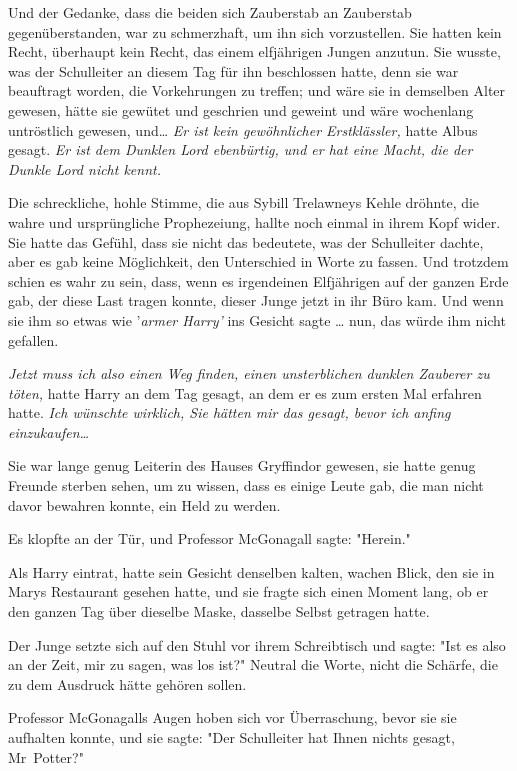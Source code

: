 {Und der Gedanke, dass die beiden sich Zauberstab an Zauberstab gegenüberstanden, war zu schmerzhaft, um ihn sich vorzustellen. Sie hatten kein Recht, überhaupt kein Recht, das einem elfjährigen Jungen anzutun. Sie wusste, was der Schulleiter an diesem Tag für ihn beschlossen hatte, denn sie war beauftragt worden, die Vorkehrungen zu treffen; und wäre sie in demselben Alter gewesen, hätte sie gewütet und geschrien und geweint und wäre wochenlang untröstlich gewesen, und… \emph{Er ist kein gewöhnlicher Erstklässler,} hatte Albus gesagt. \emph{Er ist dem Dunklen Lord ebenbürtig, und er hat eine Macht, die der Dunkle Lord nicht kennt.}

Die schreckliche, hohle Stimme, die aus Sybill Trelawneys Kehle dröhnte, die wahre und ursprüngliche Prophezeiung, hallte noch einmal in ihrem Kopf wider. Sie hatte das Gefühl, dass sie nicht das bedeutete, was der Schulleiter dachte, aber es gab keine Möglichkeit, den Unterschied in Worte zu fassen. Und trotzdem schien es wahr zu sein, dass, wenn es irgendeinen Elfjährigen auf der ganzen Erde gab, der diese Last tragen konnte, dieser Junge jetzt in ihr Büro kam. Und wenn sie ihm so etwas wie '\emph{armer Harry'} ins Gesicht sagte … nun, das würde ihm nicht gefallen.

\emph{Jetzt muss ich also einen Weg finden, einen unsterblichen dunklen Zauberer zu töten,} hatte Harry an dem Tag gesagt, an dem er es zum ersten Mal erfahren hatte. \emph{Ich wünschte wirklich, Sie hätten mir das gesagt, bevor ich anfing einzukaufen…}

Sie war lange genug Leiterin des Hauses Gryffindor gewesen, sie hatte genug Freunde sterben sehen, um zu wissen, dass es einige Leute gab, die man nicht davor bewahren konnte, ein Held zu werden.

Es klopfte an der Tür, und Professor McGonagall sagte: "Herein."

Als Harry eintrat, hatte sein Gesicht denselben kalten, wachen Blick, den sie in Marys Restaurant gesehen hatte, und sie fragte sich einen Moment lang, ob er den ganzen Tag über dieselbe Maske, dasselbe Selbst getragen hatte.

Der Junge setzte sich auf den Stuhl vor ihrem Schreibtisch und sagte: "Ist es also an der Zeit, mir zu sagen, was los ist?" Neutral die Worte, nicht die Schärfe, die zu dem Ausdruck hätte gehören sollen.

Professor McGonagalls Augen hoben sich vor Überraschung, bevor sie sie aufhalten konnte, und sie sagte: "Der Schulleiter hat Ihnen nichts gesagt, Mr~Potter?"

}
